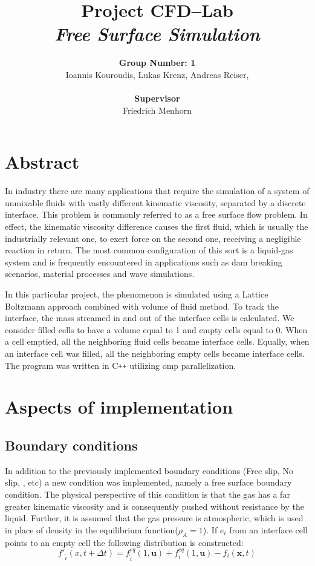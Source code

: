 \documentclass[10pt,a4paper,notitlepage]{article}
\begin{document}
\title{Project CFD--Lab\\ \textit{Free Surface Simulation}}
\author{\textbf{Group Number: 1}\\Ioannis Kouroudis, Lukas Krenz, Andreas Reiser,  \\ \\\textbf{Supervisor}\\Friedrich Menhorn}
\maketitle
\section*{Abstract}
In industry there are many applications that require the simulation of a system of unmixable fluids with vastly different kinematic viscosity, separated by a discrete interface.  This problem is commonly referred to as a free surface flow problem. In effect, the kinematic viscosity difference causes the first fluid, which is usually the industrially relevant one, to exert force on the second one, receiving a negligible reaction in return. The most common configuration of this sort is a liquid-gas system and is frequently encountered in applications such as dam breaking scenarios, material processes and wave simulations.

	In this particular project, the phenomenon is simulated  using a Lattice Boltzmann approach combined with volume of fluid method. To track the interface, the mass streamed in and out of the interface cells is calculated. We consider filled cells to have a volume equal to 1 and empty cells equal to 0. When a cell emptied, all the neighboring fluid cells became interface cells. Equally, when an interface cell was filled, all the neighboring empty cells became interface cells.
	The program was written in C\texttt{++} utilizing omp parallelization.
        
\section{Aspects of implementation}
\subsection{Boundary conditions}
In addition to the previously implemented boundary conditions (Free slip, No slip, , etc) a new condition was implemented, namely a free surface boundary condition.
The physical perspective of this condition is that the gas has a far greater kinematic viscosity and is consequently pushed without resistance by the liquid. Further, it is assumed that the gas pressure is atmospheric, which is used in place of density in the equilibrium function($\rho_{A} = 1$).
If $e_{i}$ from an interface cell points to an empty cell the following distribution is constructed:
\begin{equation} \label{eq:dist}
f'_{\hat{i}} (x, t + \Delta t) = f^{eq}_{\hat{i}}(1, \mathbf{u})+f^{eq}_{{i}}(1, \mathbf{u})-f_{i}(\mathbf{x},t)
\end{equation}
\end{document}
